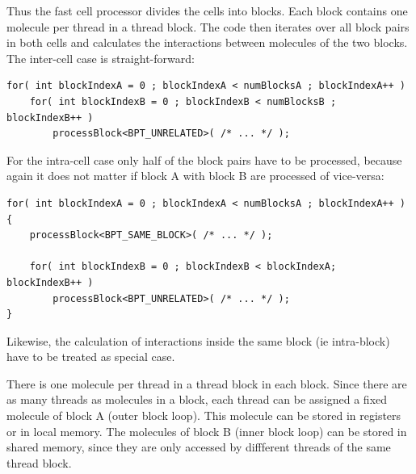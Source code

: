 Thus the fast cell processor divides the cells into blocks. Each block contains one molecule per thread in a thread block.
The code then iterates over all block pairs in both cells and calculates the interactions between molecules of the two blocks.
The inter-cell case is straight-forward:
\begin{lstlisting}[label=intercellloop,caption=Inter-Cell Block Processing]
for( int blockIndexA = 0 ; blockIndexA < numBlocksA ; blockIndexA++ )
	for( int blockIndexB = 0 ; blockIndexB < numBlocksB ; blockIndexB++ )
		processBlock<BPT_UNRELATED>( /* ... */ );

\end{lstlisting}
For the intra-cell case only half of the block pairs have to be processed, because again it does not matter if block A with block B are processed of vice-versa:
\begin{lstlisting}[label=intracellloop,caption=Intra-Cell Block Processing]
for( int blockIndexA = 0 ; blockIndexA < numBlocksA ; blockIndexA++ ) {
	processBlock<BPT_SAME_BLOCK>( /* ... */ );
	
	for( int blockIndexB = 0 ; blockIndexB < blockIndexA; blockIndexB++ )
		processBlock<BPT_UNRELATED>( /* ... */ );
}
\end{lstlisting}
Likewise, the calculation of interactions inside the same block (ie intra-block) have to be treated as special case.

There is one molecule per thread in a thread block in each block. Since there are as many threads as molecules in a block, each thread can be assigned a fixed molecule of block A (outer block loop). This molecule can be stored in registers or in local memory.
The molecules of block B (inner block loop) can be stored in shared memory, since they are only accessed by diffferent threads of the same thread block.

